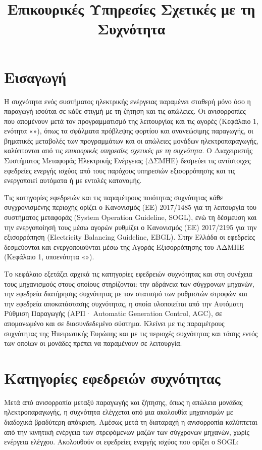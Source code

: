 \title{Επικουρικές Υπηρεσίες Σχετικές με τη Συχνότητα}

\section{Εισαγωγή}
\label{kef-03-theoria}

Η συχνότητα ενός συστήματος ηλεκτρικής ενέργειας παραμένει σταθερή μόνο όσο η παραγωγή ισούται
σε κάθε στιγμή με τη ζήτηση και τις απώλειες. Οι ανισορροπίες που απομένουν μετά τον
προγραμματισμό της λειτουργίας και τις αγορές (Κεφάλαιο 1, ενότητα «»),
όπως τα σφάλματα πρόβλεψης φορτίου και ανανεώσιμης παραγωγής, οι βηματικές μεταβολές των
προγραμμάτων και οι απώλειες μονάδων ηλεκτροπαραγωγής, καλύπτονται από τις \emph{επικουρικές
υπηρεσίες σχετικές με τη συχνότητα}. Ο Διαχειριστής Συστήματος Μεταφοράς Ηλεκτρικής
Ενέργειας (ΔΣΜΗΕ) δεσμεύει τις
αντίστοιχες εφεδρείες ενεργής ισχύος από τους παρόχους υπηρεσιών εξισορρόπησης και τις
ενεργοποιεί αυτόματα ή με εντολές κατανομής.

Τις κατηγορίες εφεδρειών και τις παραμέτρους ποιότητας συχνότητας κάθε συγχρονισμένης περιοχής
ορίζει ο Κανονισμός (ΕΕ) 2017/1485 για τη λειτουργία του συστήματος μεταφοράς (System
Operation Guideline, SOGL), ενώ τη δέσμευση και την ενεργοποίησή τους μέσω αγορών ρυθμίζει ο
Κανονισμός (ΕΕ) 2017/2195 για την εξισορρόπηση (Electricity Balancing Guideline, EBGL). Στην
Ελλάδα οι εφεδρείες δεσμεύονται και ενεργοποιούνται μέσω της Αγοράς Εξισορρόπησης του ΑΔΜΗΕ
(Κεφάλαιο 1, υποενότητα «»).

Το κεφάλαιο εξετάζει αρχικά τις κατηγορίες εφεδρειών συχνότητας και στη συνέχεια τους
μηχανισμούς στους οποίους στηρίζονται: την αδράνεια των σύγχρονων μηχανών, την εφεδρεία
διατήρησης συχνότητας με τον στατισμό των ρυθμιστών στροφών και την εφεδρεία αποκατάστασης
συχνότητας, η οποία υλοποιείται από την Αυτόματη Ρύθμιση Παραγωγής (ΑΡΠ· Automatic Generation
Control, AGC), σε απομονωμένο και σε διασυνδεδεμένο σύστημα. Κλείνει με τις παραμέτρους
συχνότητας της Ηπειρωτικής Ευρώπης και με τις περιοχές συχνότητας και τάσης εντός των
οποίων οι μονάδες πρέπει να παραμένουν σε λειτουργία.

\section{Κατηγορίες εφεδρειών συχνότητας}
\label{sec:reserves}

Μετά από ανισορροπία μεταξύ παραγωγής και ζήτησης, όπως η απώλεια μονάδας ηλεκτροπαραγωγής, η
συχνότητα ελέγχεται από μια ακολουθία μηχανισμών με διαδοχικά βραδύτερη απόκριση. Αμέσως μετά
τη διαταραχή η ανισορροπία καλύπτεται από την κινητική ενέργεια των στρεφόμενων μαζών των
σύγχρονων μηχανών, χωρίς ενέργεια ελέγχου. Ακολουθούν οι εφεδρείες ενεργής ισχύος που ορίζει ο
SOGL:

